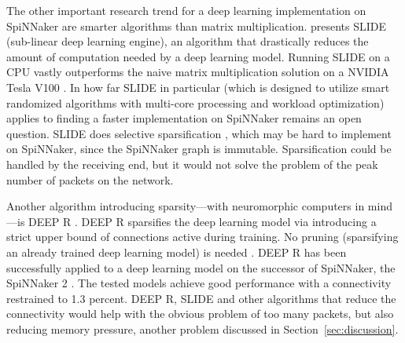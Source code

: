 \documentclass[]{article}
\begin{document}
The other important research trend for a deep learning implementation
on  SpiNNaker are smarter algorithms than matrix multiplication.
\citet{chen_et_al_2019} presents SLIDE (sub-linear deep learning
engine), an algorithm that drastically reduces the amount of
computation needed by a deep learning model.
Running SLIDE on a CPU vastly outperforms the naive matrix
multiplication solution on a NVIDIA Tesla V100
\citep{chen_et_al_2019}.
In how far SLIDE in particular (which is designed to utilize smart
randomized algorithms with multi-core processing and workload
optimization) applies to finding a faster implementation on SpiNNaker
remains an open question.
SLIDE does selective sparsification
\citep{chen_et_al_2019, blanc_et_al_2018}, which may be hard to
implement on SpiNNaker, since the SpiNNaker graph is immutable.
Sparsification could be handled by the receiving end, but it would
not solve the problem of the peak number of packets on the
network.

Another algorithm introducing sparsity---with neuromorphic computers
in mind---is DEEP R \citep{bellec_et_al_2017}.
DEEP R sparsifies the deep learning model via introducing a strict
upper bound of connections active during training.
No pruning (sparsifying an already trained deep learning model)
is needed \citep{bellec_et_al_2017}.
DEEP R has been successfully applied to a deep learning model on the
successor of SpiNNaker, the SpiNNaker 2 \citep{liu_et_al_2018}.
The tested models achieve good performance with a connectivity
restrained to 1.3 percent.
DEEP R, SLIDE and other algorithms that reduce the connectivity would
help with the obvious problem of too many packets, but also reducing
memory pressure, another problem discussed in
Section~\ref{sec:discussion}.





\end{document}
